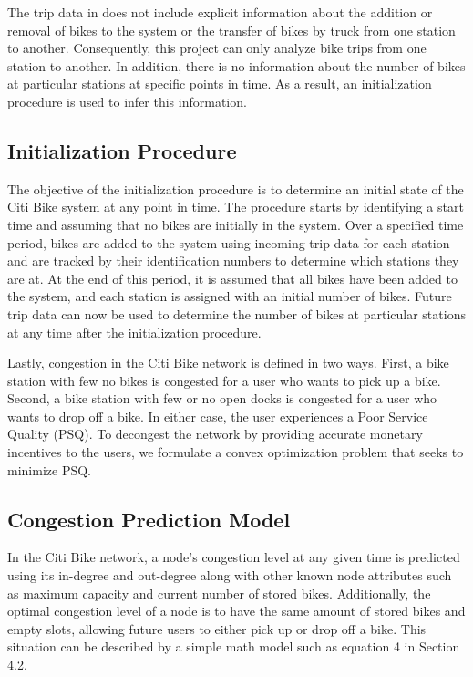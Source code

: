 \documentclass[times, 10pt,twocolumn]{article}
\begin{document}
The trip data in \cite{dataset} does not include explicit information about the addition or removal of bikes to the system or the transfer of bikes by truck from one station to another. Consequently, this project can only analyze bike trips from one station to another. In addition, there is no information about the number of bikes at particular stations at specific points in time. As a result, an initialization procedure is used to infer this information.

\subsection{Initialization Procedure}
The objective of the initialization procedure is to determine an initial state of the Citi Bike system at any point in time. The procedure starts by identifying a start time and assuming that no bikes are initially in the system. Over a specified time period, bikes are added to the system using incoming trip data for each station and are tracked by their identification numbers to determine which stations they are at. At the end of this period, it is assumed that all bikes have been added to the system, and each station is assigned with an initial number of bikes. Future trip data can now be used to determine the number of bikes at particular stations at any time after the initialization procedure.

Lastly, congestion in the Citi Bike network is defined in two ways. First, a bike station with few no bikes is congested for a user who wants to pick up a bike. Second, a bike station with few or no open docks is congested for a user who wants to drop off a bike. In either case, the user experiences a Poor Service Quality (PSQ). To decongest the network by providing accurate monetary incentives to the users, we formulate a convex optimization problem that seeks to minimize PSQ.

\subsection{Congestion Prediction Model}

In the Citi Bike network, a node's congestion level at any given time is predicted using its in-degree and out-degree along with other known node attributes such as maximum capacity and current number of stored bikes. Additionally, the optimal congestion level of a node is to have the same amount of stored bikes and empty slots, allowing future users to either pick up or drop off a bike. This situation can be described by a simple math model such as equation 4 in Section 4.2.
\end{document}
